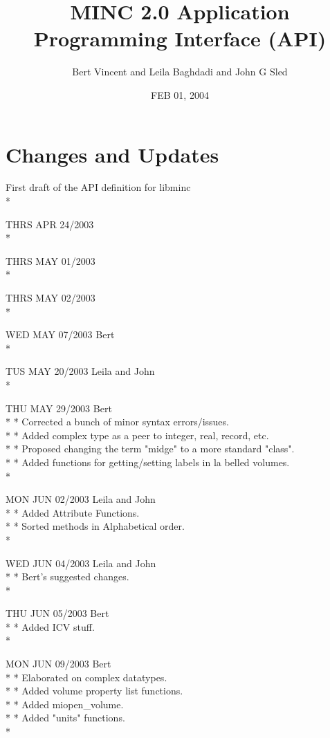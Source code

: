 \documentclass{article}
\title{MINC 2.0 Application Programming Interface (API)}
\author{Bert Vincent and Leila Baghdadi and John G Sled}
\date{FEB 01, 2004}
\begin{document}
\maketitle

\tableofcontents

\clearpage

\section{Changes and Updates}

First draft of the API definition for libminc\\*

THRS APR 24/2003\\*

THRS MAY 01/2003\\*

THRS MAY 02/2003\\*

WED  MAY 07/2003 Bert\\*

TUS  MAY 20/2003 Leila and John\\*

THU  MAY 29/2003 Bert\\*
* Corrected a bunch of minor syntax errors/issues.\\*
* Added complex type as a peer to integer, real, record, etc.\\*
* Proposed changing the term "midge" to a more standard "class".\\*
* Added functions for getting/setting labels in la belled volumes.\\*

MON  JUN 02/2003 Leila and John\\*
* Added Attribute Functions.\\*
* Sorted methods in Alphabetical order.\\*

WED  JUN 04/2003 Leila and John\\*
* Bert's suggested changes.\\*

THU  JUN 05/2003 Bert\\*
* Added ICV stuff.\\*

MON  JUN 09/2003 Bert\\*
* Elaborated on complex datatypes.\\*
* Added volume property list functions.\\*
* Added miopen\_volume.\\*
* Added "units" functions.\\*
\end{document}
